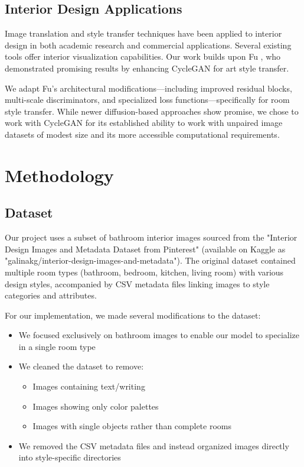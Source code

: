\documentclass[twocolumn,superscriptaddress,aps]{revtex4-1}
\begin{document}
\subsection{Interior Design Applications}
Image translation and style transfer techniques have been applied to interior design in both academic research and commercial applications. Several existing tools offer interior visualization capabilities. Our work builds upon Fu \cite{fu2022digital}, who demonstrated promising results by enhancing CycleGAN for art style transfer. 

We adapt Fu's architectural modifications—including improved residual blocks, multi-scale discriminators, and specialized loss functions—specifically for room style transfer. While newer diffusion-based approaches show promise, we chose to work with CycleGAN for its established ability to work with unpaired image datasets of modest size and its more accessible computational requirements.

\section{Methodology}

\subsection{Dataset}

Our project uses a subset of bathroom interior images sourced from the "Interior Design Images and Metadata Dataset from Pinterest" (available on Kaggle as "galinakg/interior-design-images-and-metadata"). The original dataset contained multiple room types (bathroom, bedroom, kitchen, living room) with various design styles, accompanied by CSV metadata files linking images to style categories and attributes.

For our implementation, we made several modifications to the dataset:

\begin{itemize}
    \item We focused exclusively on bathroom images to enable our model to specialize in a single room type
    \item We cleaned the dataset to remove:
      \begin{itemize}
        \item Images containing text/writing
        \item Images showing only color palettes
        \item Images with single objects rather than complete rooms
      \end{itemize}
    \item We removed the CSV metadata files and instead organized images directly into style-specific directories
\end{itemize}
\end{document}
